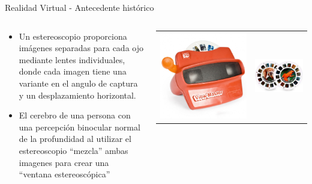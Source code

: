 \begin{frame}{Realidad Virtual - Antecedente hist\'orico}

\begin{columns}
\begin{column}{0.49\textwidth}


\begin{itemize}
\item Un estereoscopio proporciona im\'agenes separadas para cada ojo mediante lentes individuales, donde cada imagen tiene una variante en el angulo de captura y un desplazamiento horizontal.
\item El cerebro de una persona con una percepción binocular normal de la profundidad al utilizar el estereoscopio ``mezcla'' ambas imagenes para crear una  ``ventana estereoscópica''
\end{itemize}
\end{column}

\begin{column}{0.49\textwidth}

\begin{center}
	\begin{tabular}{cc}
        \includegraphics[width=0.45\linewidth]{Figs/view_master_blog-810x810.jpg} &
		\includegraphics[width=0.45\linewidth]{Figs/DiscosViewMaster.png}    
	\end{tabular}


\end{center}
\end{column}
\end{columns}
\end{frame}

